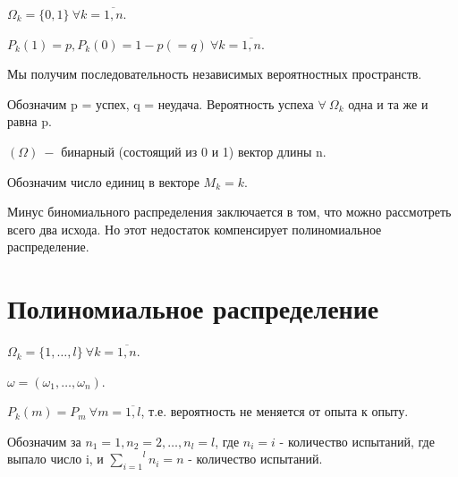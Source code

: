\documentclass[../Main.tex]{subfiles}
\begin{document}
\(\Omega_k = \{0,1\} \ \forall k = \overline{1,n}\).

\(P_k(1) = p, P_k(0) = 1-p (= q) \ \forall k = \overline{1,n}\).

Мы получим последовательность независимых вероятностных пространств.

Обозначим p = успех, q = неудача. Вероятность успеха \(\forall \ \Omega_k\) одна и та же и равна p.

\((\Omega) \ -\) бинарный (состоящий из 0 и 1) вектор длины n.

Обозначим число единиц в векторе \(M_k = k\).


Минус биномиального распределения заключается в том, что можно рассмотреть всего два исхода. Но этот недостаток компенсирует полиномиальное распределение.

\section{Полиномиальное распределение}

\(\Omega_k = \{1, \dotsc, l\} \ \forall k = \overline{1,n}\).

\(\omega = (\omega_1, \dotsc, \omega_n)\).

\(P_k(m) = P_m \ \forall m = \overline{1,l}\), т.е. вероятность не меняется от опыта к опыту.

Обозначим за \(n_1 = 1, n_2 = 2, \dotsc, n_l = l\), где \(n_i = i\) - количество испытаний, где выпало число i, и \(\overset{l}{\underset{i = 1}{\sum}} n_i = n\) - количество испытаний.
\end{document}
